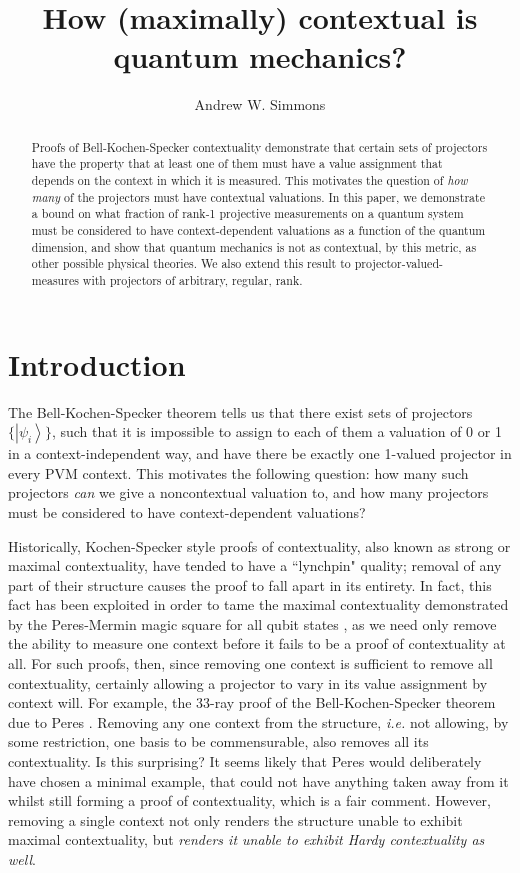 \documentclass{amsart}
\theoremstyle{definition}
\newcommand{\ket}[1]{{\left\vert{#1}\right\rangle}}
\begin{document}
\title{How (maximally) contextual is quantum mechanics?}
\author{Andrew W. Simmons}
\address{Department of Physics, Imperial College London, SW7 2AZ.}
\begin{abstract}
Proofs of Bell-Kochen-Specker contextuality demonstrate that certain sets of projectors have the property that at least one of them must have a value assignment that depends on the context in which it is measured. This motivates the question of \emph{how many} of the projectors must have contextual valuations. In this paper, we demonstrate a bound on what fraction of rank-1 projective measurements on a quantum system must be considered to have context-dependent valuations as a function of the quantum dimension, and show that quantum mechanics is not as contextual, by this metric, as other possible physical theories. We also extend this result to projector-valued-measures with projectors of arbitrary, regular, rank.
\end{abstract}
\maketitle
\section{Introduction}

The Bell-Kochen-Specker theorem tells us that there exist sets of projectors $\{\ket{\psi_i}\}$, such that it is impossible to assign to each of them a valuation of 0 or 1 in a context-independent way, and have there be exactly one 1-valued projector in every PVM context. This motivates the following question: how many such projectors \emph{can} we give a noncontextual valuation to, and how many projectors must be considered to have context-dependent valuations?

Historically, Kochen-Specker style proofs of contextuality, also known as strong or maximal contextuality, have tended to have a ``lynchpin" quality; removal of any part of their structure causes the proof to fall apart in its entirety.  In fact, this fact has been exploited in order to tame the maximal contextuality demonstrated by the Peres-Mermin magic square for all qubit states \cite{Berm2016}, as we need only remove the ability to measure one context before it fails to be a proof of contextuality at all. For such proofs, then, since removing one context is sufficient to remove all contextuality, certainly allowing a projector to vary in its value assignment by context will. 
For example, the 33-ray proof of the Bell-Kochen-Specker theorem due to Peres \cite{Pere1991}. Removing any one context from the structure, \emph{i.e.} not allowing, by some restriction, one basis to be commensurable, also removes all its contextuality. Is this surprising? It seems likely that Peres would deliberately have chosen a minimal example, that could not have anything taken away from it whilst still forming a proof of contextuality, which is a fair comment. However, removing a single context not only renders the structure unable to exhibit maximal contextuality, but \emph{renders it unable to exhibit Hardy contextuality as well}.
\end{document}
